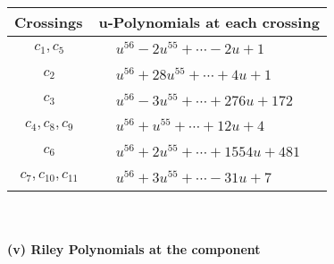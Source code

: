 \documentclass[1p]{elsarticle_modified}
\theoremstyle{definition}
\begin{document}
\begin{tabular}{m{50pt}|m{274pt}}
Crossings & \hspace{64pt}u-Polynomials at each crossing \\
\hline $$\begin{aligned}c_{1},c_{5}\end{aligned}$$&$\begin{aligned}
&u^{56}-2 u^{55}+\cdots-2 u+1
\end{aligned}$\\
\hline $$\begin{aligned}c_{2}\end{aligned}$$&$\begin{aligned}
&u^{56}+28 u^{55}+\cdots+4 u+1
\end{aligned}$\\
\hline $$\begin{aligned}c_{3}\end{aligned}$$&$\begin{aligned}
&u^{56}-3 u^{55}+\cdots+276 u+172
\end{aligned}$\\
\hline $$\begin{aligned}c_{4},c_{8},c_{9}\end{aligned}$$&$\begin{aligned}
&u^{56}+u^{55}+\cdots+12 u+4
\end{aligned}$\\
\hline $$\begin{aligned}c_{6}\end{aligned}$$&$\begin{aligned}
&u^{56}+2 u^{55}+\cdots+1554 u+481
\end{aligned}$\\
\hline $$\begin{aligned}c_{7},c_{10},c_{11}\end{aligned}$$&$\begin{aligned}
&u^{56}+3 u^{55}+\cdots-31 u+7
\end{aligned}$\\
\hline
\end{tabular}\\~\\
\newpage\renewcommand{\arraystretch}{1}
\flushleft \textbf{(v) Riley Polynomials at the component}\newline \\
\end{document}
